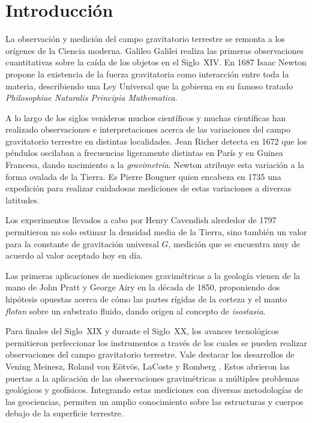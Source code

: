 \chapter{Introducción}

La observación y medición del campo gravitatorio terrestre se remonta a los
orígenes de la Ciencia moderna. Galileo Galilei realiza las primeras
observaciones cuantitativas sobre la caída de los objetos en el Siglo~XIV. En
1687 Isaac Newton propone la existencia de la fuerza gravitatoria como
interacción entre toda la materia, describiendo una Ley Universal que la
gobierna en su famoso tratado \emph{Philosophiae Naturalis Principia
Mathematica}.

A lo largo de los siglos venideros muchos científicos y muchas científicas
han realizado observaciones e interpretaciones acerca de las variaciones del
campo gravitatorio terrestre en distintas localidades. Jean Richer detecta en
1672 que los péndulos oscilaban a frecuencias ligeramente distintas en París
y en Guinea Francesa, dando nacimiento a la \emph{gravimetría}. Newton atribuye
esta variación a la forma ovalada de la Tierra. Es Pierre Bouguer quien
encabeza en 1735 una expedición para realizar cuidadosas mediciones de estas
variaciones a diversas latitudes.

Los experimentos llevados a cabo por Henry Cavendish alrededor de 1797
permitieron no solo estimar la densidad media de la Tierra, sino también un
valor para la constante de gravitación universal $G$, medición que se encuentra
muy de acuerdo al valor aceptado hoy en día.

Las primeras aplicaciones de mediciones gravimétricas a la geología
vienen de la mano de John Pratt y George Airy en la década de 1850, proponiendo
dos hipótesis opuestas acerca de cómo las partes rígidas de la corteza y el
manto \emph{flotan} sobre un substrato fluido, dando origen al concepto de
\emph{isostasia}.

Para finales del Siglo~XIX y durante el Siglo~XX, los avances tecnológicos
permitieron perfeccionar los instrumentos a través de los cuales se pueden
realizar observaciones del campo gravitatorio terrestre. Vale destacar los
desarrollos de Vening Meinesz, Roland von Eötvös, LaCoste y Romberg
\citep{blakely1995}.
Estos abrieron las puertas a la aplicación de las observaciones gravimétricas
a múltiples problemas geológicos y geofísicos. Integrando estas mediciones con
diversas metodologías de las geociencias, permiten un amplio conocimiento sobre
las estructuras y cuerpos debajo de la superficie terrestre.

